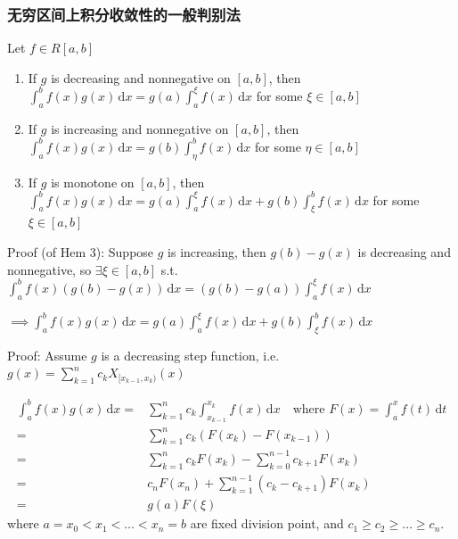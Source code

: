 \subsubsection{无穷区间上积分收敛性的一般判别法}

\begin{theorem}
    Let $f\in R[a,b]$
    \begin{enumerate}
        \item If $g$ is decreasing and nonnegative on $[a,b]$, then $\int_a^bf(x)g(x)\,\mathrm{d}x=g(a)\int_a^{\xi}f(x)\,\mathrm{d}x$ for some $\xi\in[a,b]$
        \item If $g$ is increasing and nonnegative on $[a,b]$, then $\int_a^bf(x)g(x)\,\mathrm{d}x=g(b)\int_{\eta}^{b}f(x)\,\mathrm{d}x$ for some $\eta\in[a,b]$
        \item If $g$ is monotone on $[a,b]$, then $\int_a^b f(x)g(x)\,\mathrm{d}x=g(a)\int_a^{\xi}f(x)\,\mathrm{d}x+g(b)\int_{\xi}^{b}f(x)\,\mathrm{d}x$ for some $\xi\in[a,b]$
    \end{enumerate}
\end{theorem}

Proof (of Hem 3): Suppose $g$ is increasing, then $g(b)-g(x)$ is decreasing and nonnegative, so $\exists\xi\in[a,b]$ s.t. $\int_a^bf(x)\left(g(b)-g(x)\right)\,\mathrm{d}x=\left(g(b)-g(a)\right)\int_a^{\xi}f(x)\,\mathrm{d}x$

$\implies\int_a^bf(x)g(x)\,\mathrm{d}x=g(a)\int_a^{\xi}f(x)\,\mathrm{d}x+g(b)\int_{\xi}^{b}f(x)\,\mathrm{d}x$

Proof: Assume $g$ is a decreasing step function, i.e. $g(x)=\sum_{k=1}^n c_kX_{[x_{k-1},x_k)}(x)$

\begin{align*}
    \int_a^b f(x)g(x)\,\mathrm{d}x= & \sum_{k=1}^n c_k\int_{x_{k-1}}^{x_k}f(x)\,\mathrm{d}x\quad\text{where }F(x)=\int_a^xf(t)\,\mathrm{d}t \\
    =                               & \sum_{k=1}^n c_k\left(F(x_k)-F(x_{k-1})\right)                                                        \\
    =                               & \sum_{k=1}^n c_kF(x_k)-\sum_{k=0}^{n-1} c_{k+1}F(x_{k})                                               \\
    =                               & c_nF(x_n)+\sum_{k=1}^{n-1}(c_k-c_{k+1})F(x_k)                                                         \\
    =                               & g(a)F(\xi)
\end{align*}
where $a=x_0<x_1<\dots<x_n=b$ are fixed division point, and $c_1\geq c_2\geq\dots\geq c_n$.


